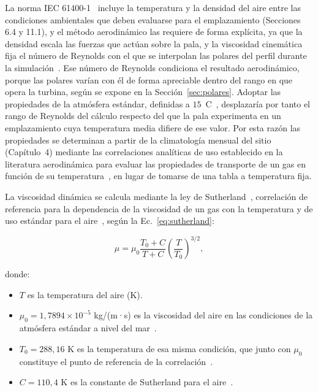 La norma IEC 61400-1~\parencite*{IEC61400-1} incluye la temperatura y la densidad del aire entre las condiciones ambientales que deben evaluarse para el emplazamiento (Secciones 6.4 y 11.1), y el método aerodinámico las requiere de forma explícita, ya que la densidad escala las fuerzas que actúan sobre la pala, y la viscosidad cinemática fija el número de Reynolds con el que se interpolan las polares del perfil durante la simulación~\parencite{marten2019qblade}. Ese número de Reynolds condiciona el resultado aerodinámico, porque las polares varían con él de forma apreciable dentro del rango en que opera la turbina, según se expone en la Sección~\ref{sec:polares}. Adoptar las propiedades de la atmósfera estándar, definidas a $15$~\textdegree C~\parencite{Anderson2016}, desplazaría por tanto el rango de Reynolds del cálculo respecto del que la pala experimenta en un emplazamiento cuya temperatura media difiere de ese valor. Por esta razón las propiedades se determinan a partir de la climatología mensual del sitio (Capítulo~4) mediante las correlaciones analíticas de uso establecido en la literatura aerodinámica para evaluar las propiedades de transporte de un gas en función de su temperatura~\parencite{White2006,Anderson2016}, en lugar de tomarse de una tabla a temperatura fija.

La viscosidad dinámica se calcula mediante la ley de Sutherland~\parencite{Sutherland1893}, correlación de referencia para la dependencia de la viscosidad de un gas con la temperatura y de uso estándar para el aire~\parencite{White2006}, según la Ec.~\ref{eq:sutherland}:

\begin{equation}
    \mu = \mu_0 \frac{T_0 + C}{T + C} \left( \frac{T}{T_0} \right)^{3/2},
    \label{eq:sutherland}
\end{equation}

donde:
\begin{itemize}
    \item $T$ es la temperatura del aire (K).
    \item $\mu_0 = 1{,}7894 \times 10^{-5}$ kg/(m·s) es la viscosidad del aire en las condiciones de la atmósfera estándar a nivel del mar~\parencite{Anderson2016}.
    \item $T_0 = 288{,}16$ K es la temperatura de esa misma condición, que junto con $\mu_0$ constituye el punto de referencia de la correlación~\parencite{Anderson2016}.
    \item $C = 110{,}4$ K es la constante de Sutherland para el aire~\parencite{White2006}.
\end{itemize}

